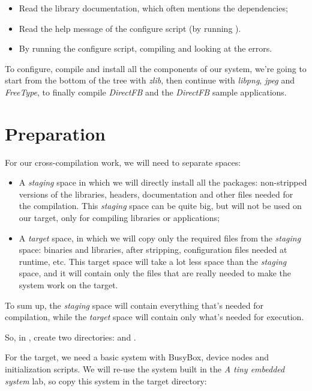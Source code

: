 \begin{itemize}
\item Read the library documentation, which often mentions the
  dependencies;
\item Read the help message of the configure script (by running
  ).
\item By running the configure script, compiling and looking at the
  errors.
\end{itemize}

To configure, compile and install all the components of our system,
we're going to start from the bottom of the tree with {\em zlib}, then
continue with {\em libpng}, \emph{jpeg} and \emph{FreeType}, to
finally compile \emph{DirectFB} and the \emph{DirectFB} sample
applications.

\section{Preparation}

For our cross-compilation work, we will need to separate spaces:
\begin{itemize}
\item A \emph{staging} space in which we will directly install all the
  packages: non-stripped versions of the libraries, headers,
  documentation and other files needed for the compilation. This
  \emph{staging} space can be quite big, but will not be used on our
  target, only for compiling libraries or applications;
\item A \emph{target} space, in which we will copy only the required
  files from the \emph{staging} space: binaries and libraries, after
  stripping, configuration files needed at runtime, etc. This target
  space will take a lot less space than the \emph{staging} space, and
  it will contain only the files that are really needed to make the
  system work on the target.
\end{itemize}

To sum up, the {\em staging} space will contain everything that's
needed for compilation, while the {\em target} space will contain only
what's needed for execution.

So, in , create two
directories:  and .

For the target, we need a basic system with BusyBox, device nodes and
initialization scripts. We will re-use the system built in the {\em A
  tiny embedded system} lab, so copy this system in the target
directory:

